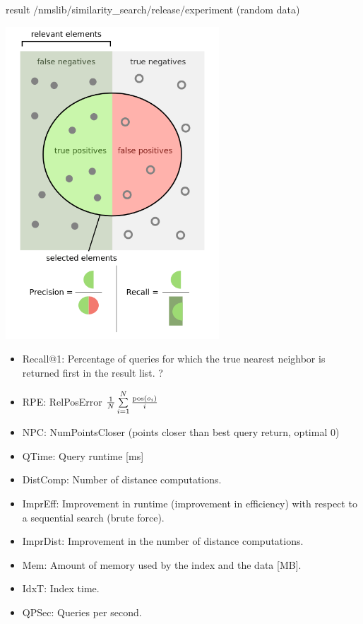 \documentclass[xcolor=dvipsnames, aspectratio=1610]{beamer}
\begin{document}
\begin{frame}[fragile]{result /nmslib/similarity_search/release/experiment (random data)}
{\begin{minipage}{0.99\textwidth}
\end{minipage}
\fboxsep=15pt 
\begin{minipage}{0.45\textwidth} 
\includegraphics[width=0.6\textwidth]{Figures/Precisionrecall.png}
\end{minipage}  
\begin{minipage}{0.45\textwidth} 
\begin{itemize}
\item Recall@1: Percentage of queries for which the true nearest neighbor is returned first in the result list. ?
\item RPE: RelPosError $\frac{1}{N} \sum\limits^N_{i=1} \frac{{\rm pos} \left( o_i \right)}{i}  $ 
\item NPC: NumPointsCloser (points closer than best query return, optimal 0)
\item QTime: Query runtime [ms] 
\item DistComp: Number of distance computations.
\item ImprEff:  Improvement in runtime (improvement in efficiency) with respect to a sequential search (brute force).
\item ImprDist:  Improvement in the number of distance computations.
\item Mem:  Amount of memory used by the index and the data [MB].
\item IdxT: Index time. 
\item QPSec: Queries per second.
\end{itemize}
\end{minipage} }
\end{frame}
\end{document}
